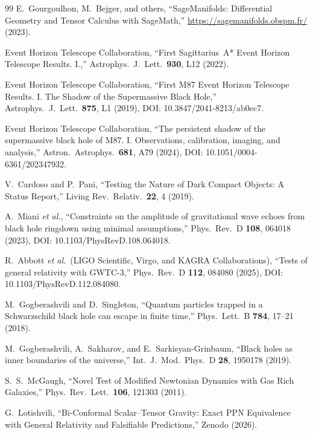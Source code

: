 \begin{thebibliography}{99}
E.~Gourgoulhon, M.~Bejger, and others,
``SageManifolds: Differential Geometry and Tensor Calculus with SageMath,''
\url{https://sagemanifolds.obspm.fr/} (2023).

Event Horizon Telescope Collaboration,
``First Sagittarius~A* Event Horizon Telescope Results. I.,''
Astrophys.\ J.\ Lett.\ \textbf{930}, L12 (2022).

Event Horizon Telescope Collaboration,
``First M87 Event Horizon Telescope Results. I. The Shadow of the Supermassive Black Hole,''
Astrophys.\ J.\ Lett.\ \textbf{875}, L1 (2019),
DOI: 10.3847/2041-8213/ab0ec7.

Event Horizon Telescope Collaboration,
``The persistent shadow of the supermassive black hole of M87. I. Observations, calibration, imaging, and analysis,''
Astron.\ Astrophys.\ \textbf{681}, A79 (2024),
DOI: 10.1051/0004-6361/202347932.

V.~Cardoso and P.~Pani,
``Testing the Nature of Dark Compact Objects: A Status Report,''
Living Rev.\ Relativ.\ \textbf{22}, 4 (2019).

A.~Miani \emph{et al.},
``Constraints on the amplitude of gravitational wave echoes from black hole ringdown using minimal assumptions,''
Phys.\ Rev.\ D \textbf{108}, 064018 (2023),
DOI: 10.1103/PhysRevD.108.064018.

R.~Abbott \emph{et al.}\ (LIGO Scientific, Virgo, and KAGRA Collaborations),
``Tests of general relativity with GWTC-3,''
Phys.\ Rev.\ D \textbf{112}, 084080 (2025),
DOI: 10.1103/PhysRevD.112.084080.

M.~Gogberashvili and D.~Singleton,
``Quantum particles trapped in a Schwarzschild black hole can escape in finite time,''
Phys.\ Lett.\ B \textbf{784}, 17--21 (2018).

M.~Gogberashvili, A.~Sakharov, and E.~Sarkisyan-Grinbaum,
``Black holes as inner boundaries of the universe,''
Int.\ J.\ Mod.\ Phys.\ D \textbf{28}, 1950178 (2019).

S.~S.~McGaugh,
``Novel Test of Modified Newtonian Dynamics with Gas Rich Galaxies,''
Phys.\ Rev.\ Lett.\ \textbf{106}, 121303 (2011).

G.~Lotishvili,
``Bi-Conformal Scalar--Tensor Gravity: Exact PPN Equivalence with General Relativity and Falsifiable Predictions,''
Zenodo (2026).


\end{thebibliography}
